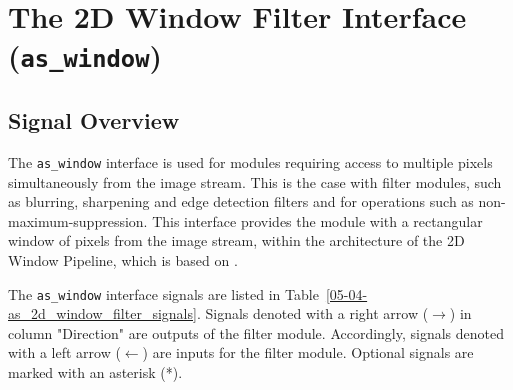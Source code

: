 


\section{The \asterics 2D Window Filter Interface (\texttt{as\_window})} \label{ch:05-03-interfaces-as_window}


\subsection{Signal Overview}

The \texttt{as\_window} interface is used for modules requiring access to multiple pixels simultaneously from the image stream.
This is the case with filter modules, such as blurring, sharpening and edge detection filters and for operations such as non-maximum-suppression.
This interface provides the module with a rectangular window of pixels from the image stream, within the architecture of the 2D Window Pipeline, which is based on \cite{pohl_efficient_2014}.

The \texttt{as\_window} interface signals are listed in Table~\ref{05-04-as_2d_window_filter_signals}. Signals denoted with a right arrow ($\rightarrow$) in column "Direction" are outputs of the filter module. Accordingly, signals denoted with a left arrow ($\leftarrow$) are inputs for the filter module.
Optional signals are marked with an asterisk (*).

